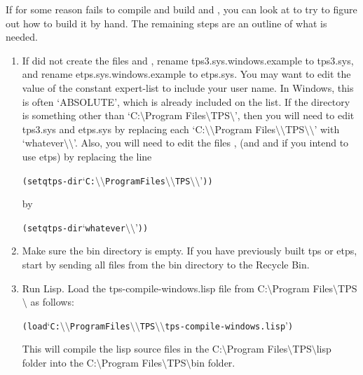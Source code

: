 If for some reason  fails to compile and build
{\TPS}{and {\ETPS}}, you can look at  to try to figure
out how to build it by hand.  The remaining steps are an outline
of what is needed.

\begin{enumerate}
\item If  did not create the files
 and ,
rename tps3.sys.windows.example to tps3.sys,
and rename etps.sys.windows.example to etps.sys.
You may want to edit the value of the constant
expert-list to include your user name.  In Windows, this is often
`ABSOLUTE', which is already included on the list.
If the {\TPS} directory is something other than
`C:\(\setminus\)Program Files\(\setminus\)TPS\(\setminus\)', then you will need to edit tps3.sys
and etps.sys by replacing each
`C:\(\setminus\setminus\)Program Files\(\setminus\setminus\)TPS\(\setminus\setminus\)' with `whatever\(\setminus\setminus\)'.
Also, you will need to edit the
files , 
(and  and 
if you intend to use etps) by replacing the line
\begin{alltt}
  (setq tps-dir `C:\(\setminus\setminus\)Program Files\(\setminus\setminus\)TPS\(\setminus\setminus\)'))
\end{alltt}
by
\begin{alltt}
  (setq tps-dir `whatever\(\setminus\setminus\)'))
\end{alltt}

\item Make sure the bin directory is empty.
If you have previously built tps or etps, start by
sending all files from the bin directory to the Recycle Bin.

\item Run Lisp.  Load the tps-compile-windows.lisp
file from C:\(\setminus\)Program Files\(\setminus\)TPS\(\setminus\) as follows:
\begin{alltt}
(load `C:\(\setminus\setminus\)Program Files\(\setminus\setminus\)TPS\(\setminus\setminus\)tps-compile-windows.lisp')
\end{alltt}
This will compile the lisp source files in the C:\(\setminus\)Program Files\(\setminus\)TPS\(\setminus\)lisp
folder into the C:\(\setminus\)Program Files\(\setminus\)TPS\(\setminus\)bin folder.


\end{enumerate}
